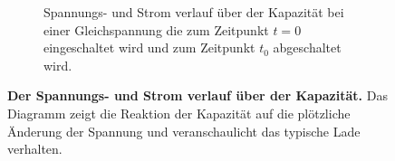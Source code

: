 {\begin{figure}[H]
\begin{subfigure}[b]{0.9\textwidth}
			\caption{Spannungs- und Strom verlauf über der Kapazität bei einer Gleichspannung die zum Zeitpunkt $t = 0$ eingeschaltet wird und zum Zeitpunkt $t_\mathrm{0}$ abgeschaltet wird.}
			\label{fig:Spannungsverlauf_CR}
		\end{subfigure}
		\caption{\textbf{Der Spannungs- und Strom verlauf über der Kapazität.} Das Diagramm zeigt die Reaktion der Kapazität auf die plötzliche Änderung der Spannung und
		veranschaulicht das typische Lade verhalten.}
		\label{fig:Gesamtdarstellung}
		\end{figure}
}

